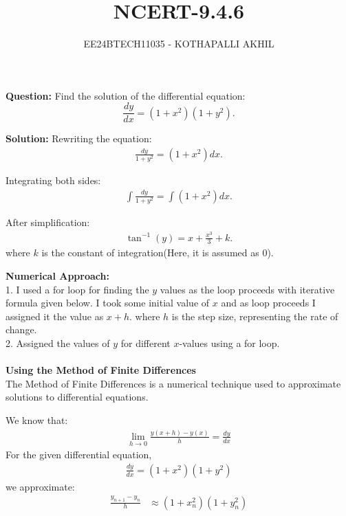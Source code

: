 \documentclass[article]{IEEEtran}
\numberwithin{figure}{enumi}
\begin{document}

\title{NCERT-9.4.6}
\author{EE24BTECH11035 - KOTHAPALLI AKHIL}
{\let\newpage\relax\maketitle}

\noindent\textbf{Question: }  
Find the solution of the differential equation:  
\begin{equation*}
    \frac{dy}{dx} = (1 + x^2)(1 + y^2).
\end{equation*}

\noindent\textbf{Solution:}  
Rewriting the equation:  
\begin{align}
    \frac{dy}{1 + y^2} = (1 + x^2) dx.
\end{align}

\noindent Integrating both sides:  
\begin{align}
    \int \frac{dy}{1 + y^2} = \int (1 + x^2) dx.
\end{align}

\noindent After simplification:  
\begin{align}
    \tan^{-1}(y) = x + \frac{x^3}{3} + k.
\end{align}
where $k$ is the constant of integration(Here, it is assumed as 0).

\vspace{0.5em}

\noindent\textbf{Numerical Approach:}\\1. I used a for loop for finding the $y$ values as the loop proceeds with iterative formula given below. I took some initial value of $x$ and as loop proceeds I assigned it the value as $x+h$. where $h$ is the step size, representing the rate of change. 
\\2. Assigned the values of $y$ for different $x$-values using a for loop. \\ 
\\ \textbf{Using the Method of Finite Differences}\\
The Method of Finite Differences is a numerical technique used to approximate solutions to differential equations. 

We know that:
\begin{align}
   \lim_{h \to 0} \frac{y(x+h) - y(x)}{h} = \frac{dy}{dx} 
\end{align}
For the given differential equation,
\begin{align}
\frac{dy}{dx} = (1+x^2)(1+y^2)    
\end{align}
we approximate:
\begin{align}
\frac{y_{n+1} - y_n}{h} &\approx (1 + x_n^2)(1 + y_n^2)
\end{align}
\end{document}
